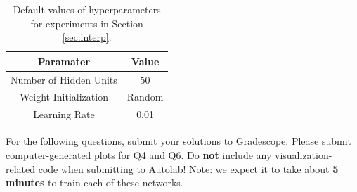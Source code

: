 \documentclass[11pt]{exam}
\numberwithin{equation}{section} %
\numberwithin{figure}{section} %
\numberwithin{table}{section} %
\begin{document}
\begin{table}[H]
    \centering
    \begin{tabular}{|c|c|}
        \hline
        \textbf{Paramater} & \textbf{Value} \\
        \hline
        Number of Hidden Units & 50 \\
        \hline
        Weight Initialization & {\sc Random} \\
        \hline
        Learning Rate & 0.01 \\
        \hline
        
    \end{tabular}
    \caption{Default values of hyperparameters for experiments in Section \ref{sec:interp}.}
    \label{tab:params}
\end{table}

 For the following questions, submit your solutions to Gradescope. Please submit computer-generated plots for Q4 and Q6. Do {\bf not} include any visualization-related code when submitting to Autolab! Note: we expect it to take about {\bf 5 minutes} to train each of these networks.
 
\end{document}
